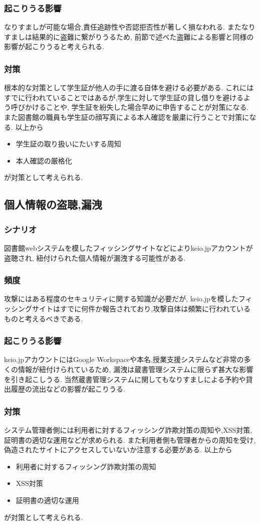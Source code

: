 \documentclass[uplatex,a4j,11pt,dvipdfmx]{jsarticle}
\begin{document}
\subsubsection{起こりうる影響}
なりすましが可能な場合,責任追跡性や否認拒否性が著しく損なわれる.
またなりすましは結果的に盗難に繋がりうるため,
前節で述べた盗難による影響と同様の影響が起こりうると考えられる.
\subsubsection{対策}
根本的な対策として学生証が他人の手に渡る自体を避ける必要がある.
これにはすでに行われていることではあるが,学生に対して学生証の貸し借りを避けるよう呼びかけることや,
学生証を紛失した場合早めに申告することが対策になる.
また図書館の職員も学生証の顔写真による本人確認を厳粛に行うことで対策になる.
以上から
\begin{itemize}
  \item 学生証の取り扱いにたいする周知
  \item 本人確認の厳格化
\end{itemize}
が対策として考えられる.
\subsection{個人情報の盗聴,漏洩}
\subsubsection{シナリオ}
図書館webシステムを模したフィッシングサイトなどによりkeio.jpアカウントが盗聴され,
紐付けられた個人情報が漏洩する可能性がある.
\subsubsection{頻度}
攻撃にはある程度のセキュリティに関する知識が必要だが,
keio.jpを模したフィッシングサイトはすでに何件か報告されており,攻撃自体は頻繁に行われているものと考えるべきである.
\subsubsection{起こりうる影響}
keio.jpアカウントにはGoogle Workspaceや本名,授業支援システムなど非常の多くの情報が紐付けられているため,
漏洩は蔵書管理システムに限らず甚大な影響を引き起こしうる.
当然蔵書管理システムに関してもなりすましによる予約や貸出履歴の流出などの影響が起こりうる.
\subsubsection{対策}
システム管理者側には利用者に対するフィッシング詐欺対策の周知や,XSS対策,証明書の適切な運用などが求められる.
また利用者側も管理者からの周知を受け,偽造されたサイトにアクセスしていないか注意する必要がある.
以上から
\begin{itemize}
  \item 利用者に対するフィッシング詐欺対策の周知
  \item XSS対策
  \item 証明書の適切な運用
\end{itemize}
が対策として考えられる.
\end{document}
